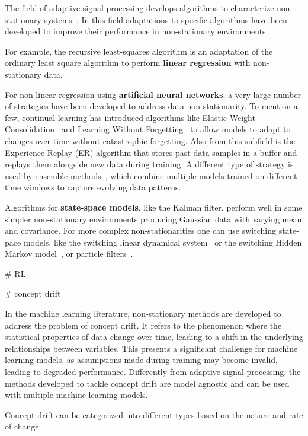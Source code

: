 \documentclass[12pt]{article}
\begin{document}
The field of adaptive signal processing develops algorithms to characterize
non-stationary systems~\citep{haykin02}. In this field adaptations to specific
algorithms have been developed to improve their performance in non-stationary
environments.

For example, the recursive least-squares algorithm \citep[][Chapter
9]{haykin02} is an adaptation of the ordinary least square algorithm to perform
\textbf{linear regression} with non-stationary data.

For non-linear regression using \textbf{artificial neural networks}, a very large number
of strategies have been developed to address data non-stationarity. To mention
a few, continual learning has introduced algorithms like  Elastic Weight
Consolidation~\citep[EWC][]{} and Learning Without Forgetting~\citep[LwF][]{}
to allow models to adapt to changes over time without catastrophic forgetting.
Also from this subfield is the Experience Replay (ER) algorithm that stores
past data samples in a buffer and replays them alongside new data during
training. A different type of strategy is used by ensemble methods~\citep{},
which combine multiple models trained on different time windows to capture
evolving data patterns.

Algorithms for \textbf{state-space models}, like the Kalman filter, perform well in some
simpler non-stationary environments producing Gaussian data with varying mean and
covariance.
%
For more complex non-stationarities one can use switching state-pace models,
like the switching linear dynamical system~\cite{} or the switching Hidden
Markov model~\cite{}, or particle filters~\citep{}.

# RL

# concept drift

In the machine learning literature, non-stationary methods are developed to
address the problem of concept drift. It refers to the phenomenon where the
statistical properties of data change over time, leading to a shift in the
underlying relationships between variables. This presents a significant
challenge for machine learning models, as assumptions made during training may
become invalid, leading to degraded performance.
%
Differently from adaptive signal processing, the methods developed to tackle
concept drift are model agnostic and can be used with multiple machine learning
models.

Concept drift can be categorized into different types based on the nature and
rate of change:
\end{document}
